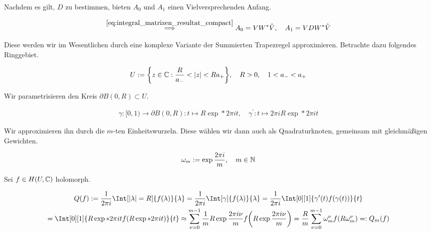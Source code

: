 Nachdem es gilt, $D$ zu bestimmen, bieten $A_0$ und $A_1$ einen Vielversprechenden Anfang.

\begin{align} \label{eq:integral_matrizen_resultat}
    \stackrel
    {
        \eqref{eq:integral_matrizen_resultat_compact}
    }{\implies}
    A_0 = V W^\ast \hat V,
    \quad
    A_1 = V D W^\ast \hat V
\end{align}

Diese werden wir im Wesentlichen durch eine komplexe Variante der Summierten Trapezregel approximieren.
Betrachte dazu folgendes Ringgebiet.

\begin{align*}
    U := {\left \{ z \in \mathbb{C}: \frac{R}{a_-} < |z| < R a_+ \right \}},
    \quad
    R > 0,
    \quad
    1 < a_- < a_+
\end{align*}

Wir parametrisieren den Kreis $\partial B(0, R) \subset U$.

\begin{align*}
    \gamma: [0, 1) \to \partial B(0, R): t \mapsto R \exp*{2 \pi i t},
    \quad
    \gamma^\prime: t \mapsto 2 \pi i R \exp*{2 \pi i t}
\end{align*}

Wir approximieren ihn durch die $m$-ten Einheitswurzeln.
Diese wählen wir dann auch als Quadraturknoten, gemeinsam mit gleichmäßigen Gewichten.

\begin{align*}
    \omega_m := \exp \frac{2 \pi i}{m},
    \quad
    m \in \mathbb{N}
\end{align*}

Sei $f \in H(U, \mathbb{C})$ holomorph.

\begin{multline*}
    Q(f)
    :=
    \frac{1}{2 \pi i}
    \Int[|\lambda| = R]
    {
        f(\lambda)
    }{\lambda}
    =
    \frac{1}{2 \pi i}
    \Int[\gamma]
    {
        f(\lambda)
    }{\lambda}
    =
    \frac{1}{2 \pi i}
    \Int[0][1]
    {
        \gamma^\prime(t)
        f(\gamma(t))
    }{t} \\
    =
    \Int[0][1]
    {
        R
        \exp*{2 \pi i t}
        f(R \exp*{2 \pi i t})
    }{t}
    \approx
    \sum_{\nu = 0}^{m-1}
        \frac{1}{m}
        R \exp \frac{2 \pi i \nu}{m}
        f
        \pbraces
        {
            R \exp \frac{2 \pi i \nu}{m}
        }
    =
    \frac{R}{m}
    \sum_{\nu = 0}^{m-1}
        \omega_m^\nu
        f(R \omega_m^\nu)
    =:
    Q_m(f)
\end{multline*}

